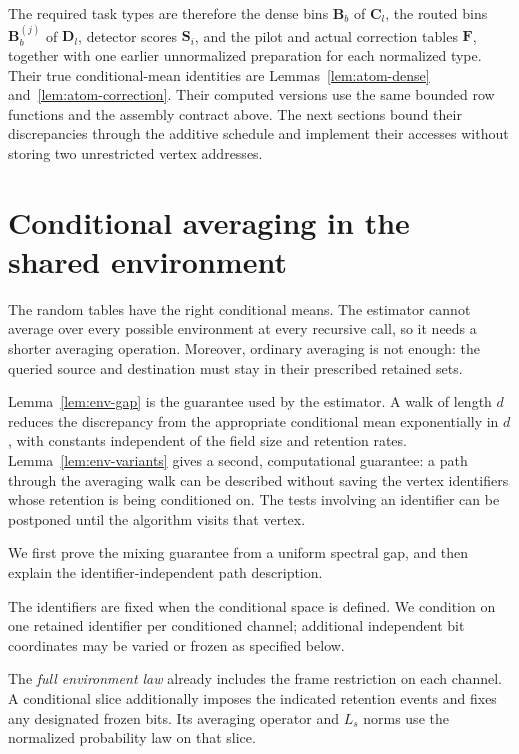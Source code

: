 \documentclass[11pt]{article}
\numberwithin{equation}{section}
\theoremstyle{definition}
\theoremstyle{remark}
\begin{document}
The required task types are therefore the dense bins ${\mathbf{B}}_b$ of
${\mathbf{C}}_l$, the routed bins ${\mathbf{B}}_b^{(j)}$ of ${\mathbf{D}}_l$, detector scores
${\mathbf{S}}_i$, and the pilot and actual correction tables ${\mathbf{F}}$,
together with one earlier unnormalized preparation for each normalized
type.  Their true conditional-mean identities are
Lemmas~\ref{lem:atom-dense} and~\ref{lem:atom-correction}.  Their computed
versions use the same bounded row functions and the assembly contract
above.  The next sections bound their discrepancies through the
additive schedule and implement their accesses without storing two
unrestricted vertex addresses.





\section{Conditional averaging in the shared environment}
\label{sec:averaging}

The random tables have the right conditional means. The estimator cannot average over every possible environment at every recursive call, so it needs a shorter averaging operation. Moreover, ordinary averaging is not enough: the queried source and destination must stay in their prescribed retained sets.

Lemma~\ref{lem:env-gap} is the guarantee used by the estimator. A walk of length $d$ reduces the discrepancy from the appropriate conditional mean exponentially in $d$, with constants independent of the field size and retention rates. Lemma~\ref{lem:env-variants} gives a second, computational guarantee: a path through the averaging walk can be described without saving the vertex identifiers whose retention is being conditioned on. The tests involving an identifier can be postponed until the algorithm visits that vertex.

We first prove the mixing guarantee from a uniform spectral gap, and then explain the identifier-independent path description.

The identifiers are fixed when the conditional space is defined.  We
condition on one retained identifier per conditioned channel; additional
independent bit coordinates may be varied or frozen as specified below.

The \emph{full environment law} already includes the frame restriction
on each channel.  A conditional slice additionally imposes the indicated
retention events and fixes any designated frozen bits.  Its averaging
operator and $L_s$ norms use the normalized probability law on that slice.
\end{document}
